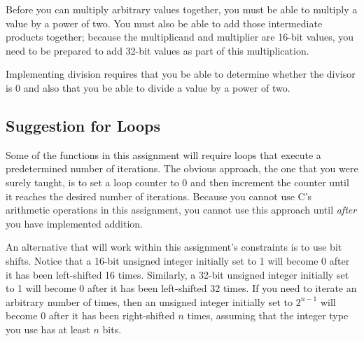     Before you can multiply arbitrary values together, you must be able to multiply a value by a power of two.
    You must also be able to add those intermediate products together;
    because the multiplicand and multiplier are 16-bit values, you need to be prepared to add 32-bit values as part of this multiplication.

    Implementing division requires that you be able to determine whether the divisor is 0 and also that you be able to divide a value by a power of two.


\subsection{Suggestion for Loops}

Some of the functions in this assignment will require loops that execute a predetermined number of iterations.
The obvious approach, the one that you were surely taught, is to set a loop counter to 0 and then increment the counter until it reaches the desired number of iterations.
Because you cannot use C's arithmetic operations in this assignment, you cannot use this approach until \textit{after} you have implemented addition.

An alternative that will work within this assignment's constraints is to use bit shifts.
Notice that a 16-bit unsigned integer initially set to 1 will become 0 after it has been left-shifted 16 times.
Similarly, a 32-bit unsigned integer initially set to 1 will become 0 after it has been left-shifted 32 times.
If you need to iterate an arbitrary number of times, then an unsigned integer initially set to $2^{n-1}$ will become 0 after it has been right-shifted $n$ times, assuming that the integer type you use has at least $n$ bits.
